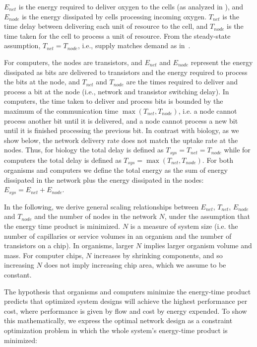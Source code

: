 \documentclass[12pt]{article}
\begin{document}
$E_{net}$ is the energy required to deliver oxygen to the cells (as analyzed in
\cite{west97}), and $E_{node}$ is the energy dissipated by cells processing
incoming oxygen. $T_{net}$ is the time delay between delivering
each unit of resource to the cell, and $T_{node}$ is the time taken
for the cell to process a unit of resource. From the steady-state assumption, $T_{net} = T_{node}$,
i.e., supply matches demand as in~\cite{banavar10}.

For computers, the nodes are transistors, and 
$E_{net}$ and $E_{node}$ represent the energy dissipated as bits are delivered
to transistors and the energy required to process the bits at the node, and
$T_{net}$ and $T_{node}$ are the times required to deliver and process a bit at
the node (i.e., network and transistor switching delay).  In computers, the time
taken to deliver and process bits is bounded by the maximum of the
communication time $\max(T_{net},T_{node})$, i.e. a node cannot process another
bit until it is delivered, and a node cannot process a new bit until it is finished
processing the previous bit. 
In contrast with biology, as we show below, the
network delivery rate does not match the uptake rate at the nodes.  Thus,  for
biology the total delay is defined as $T_{sys}=T_{net} = T_{node}$ while for
computers the total delay is defined as $T_{sys}=\max(T_{net},T_{node})$. For
both organisms and computers we define the total energy as the sum of energy
dissipated in the network plus the energy dissipated in the nodes: $E_{sys} =
E_{net} + E_{node}$.

In the following, we derive general scaling relationships between $E_{net}$,
$T_{net}$, $E_{node}$ and $T_{node}$ and the number of nodes in the network
$N$, under the assumption that the energy time product is minimized.  $N$ is a
measure of system size (i.e. the number of capillaries or service volumes in
an organism and the number of transistors on a chip). In organisms, larger $N$
implies larger organism volume and mass. For computer chips, $N$ increases by
shrinking components, and so increasing $N$ does not imply increasing chip
area, which we assume to be constant.

The hypothesis that organisms and computers minimize the energy-time product
predicts that optimized system designs will achieve
the highest performance per cost, where performance is given by flow and cost
by energy expended.  To show this mathematically, 
we express the optimal network design as a constraint optimization problem in
which the whole system's energy-time product is minimized:
\end{document}
